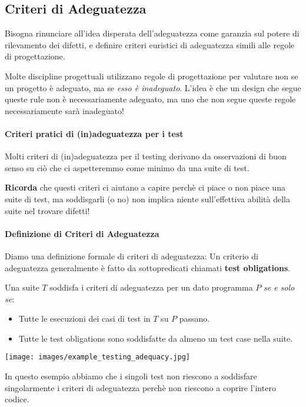 \subsection{Criteri di Adeguatezza}
Bisogna rinunciare all'idea disperata dell'adeguatezza come garanzia sul potere di rilevamento dei difetti,
e definire criteri euristici di adeguatezza simili alle regole di progettazione.

Molte discipline progettuali utilizzano regole di progettazione per valutare non se un progetto è
adeguato, ma se \emph{esso è inadeguato}.
L'idea è che un design che segue queste rule non è necessariamente adeguato, ma uno che non segue queste regole necessariamente sarà inadeguato!

\paragraph{Criteri pratici di (in)adeguatezza per i test}
Molti criteri di (in)adeguatezza per il testing derivano da osservazioni di buon senso su ciò che ci aspetteremmo come minimo da una suite di test.

\textbf{Ricorda} che questi criteri ci aiutano a capire perchè ci piace o non piace una suite di test,
ma soddisgarli (o no) non implica niente sull'effettiva abilità della suite nel trovare difetti!

\paragraph{Definizione di Criteri di Adeguatezza}
Diamo una definizione formale di criteri di adeguatezza:
Un criterio di adeguatezza generalmente è fatto da sottopredicati chiamati \textbf{test obligations}.

Una suite $T$ soddisfa i criteri di adeguatezza per un dato programma $P$ \emph{se e solo se}:
\begin{itemize}
    \item Tutte le esecuzioni dei casi di test in $T$ su $P$ passano.
    \item Tutte le test obligations sono soddisfatte da almeno un test case nella suite.
\end{itemize}

\begin{center}
    \texttt{[image: images/example\_testing\_adequacy.jpg]}
\end{center}
In questo esempio abbiamo che i singoli test non riescono a soddisfare singolarmente i criteri di adeguatezza perchè non riescono a coprire l'intero codice.

